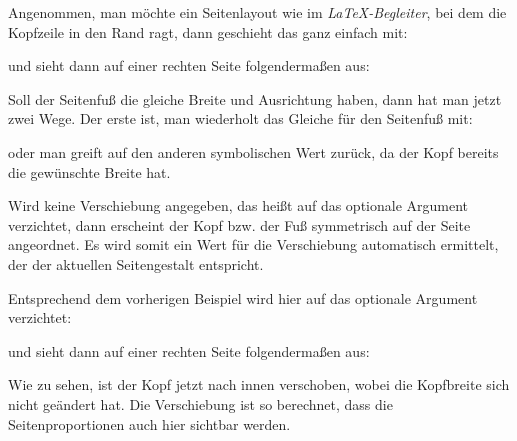 \begin{Example}
  Angenommen, man möchte ein Seitenlayout wie im
  \emph{\LaTeX-Begleiter}, bei dem die Kopfzeile in den Rand ragt,
  dann geschieht das ganz einfach mit:
\begin{lstcode}
\end{lstcode}
%
  und sieht dann auf einer rechten Seite folgendermaßen aus:
%
  \begin{XmpTopPage}
    \thinlines{}
  \end{XmpTopPage}
%
  Soll der Seitenfuß die gleiche Breite und Ausrichtung haben, dann hat man
  jetzt zwei Wege.  Der erste ist, man wiederholt das Gleiche für den
  Seitenfuß mit:
\begin{lstcode}
\end{lstcode}
%
  oder man greift auf den anderen symbolischen Wert  zurück, da
  der Kopf bereits die gewünschte Breite hat.
\begin{lstcode}
\end{lstcode}
\end{Example}

Wird keine Verschiebung angegeben, das heißt auf das optionale Argument
verzichtet, dann erscheint der Kopf bzw. der Fuß symmetrisch auf der Seite
angeordnet. Es wird somit ein Wert für die Verschiebung automatisch ermittelt,
der der aktuellen Seitengestalt entspricht.

\begin{Example}
  Entsprechend dem vorherigen Beispiel wird hier auf das optionale Argument
  verzichtet:
\begin{lstcode}
\end{lstcode}
%
  und sieht dann auf einer rechten Seite folgendermaßen aus:
%
  \begin{XmpTopPage}
        \thinlines{}
  \end{XmpTopPage}
\end{Example}

Wie zu sehen, ist der Kopf jetzt nach innen verschoben, wobei die Kopfbreite
sich nicht geändert hat. Die Verschiebung ist so berechnet, dass die
Seitenproportionen auch hier sichtbar werden.
\EndIndexGroup


